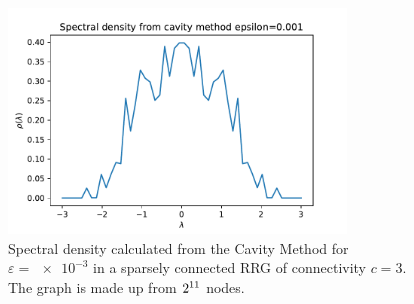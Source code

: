 \documentclass[../main.tex]{subfiles}
\begin{document}
\begin{figure}[htpb]
    \centering
    \includegraphics[width=0.8\textwidth]{../figures/ex2_spectrum_eps_large.pdf}
    \caption{
        Spectral density calculated from the Cavity Method for $\varepsilon=\num{e-3}$ in a sparsely connected RRG of connectivity $c = \num{3}$.
        The graph is made up from $\num[parse-numbers = false]{2^{11}}$ nodes.
    }
    \label{fig:rrg_spectrum_cavity}
\end{figure}
\end{document}
